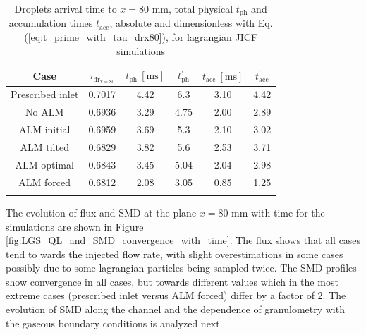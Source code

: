 \begin{table}[!h]
\centering
\caption{Droplets arrival time to $x = 80$ mm, total physical $t_\mathrm{ph}$ and accumulation times $t_\mathrm{acc}$, absolute and dimensionless with Eq. (\ref{eq:t_prime_with_tau_drx80}), for lagrangian JICF simulations}
\begin{tabular}{cccccc}
\thickhline
\textbf{Case} & $\tau_\mathrm{dr_{x=80}}$ & $t_\mathrm{ph}~[\mathrm{ms}]$ &  $t_\mathrm{ph}^{\prime}$ & $t_\mathrm{acc}~[\mathrm{ms}]$  & $t_\mathrm{acc}^{\prime}$  \\
\hline
Prescribed inlet & 0.7017 & 4.42 & 6.3 & 3.10 & 4.42 \\
No ALM & 0.6936 & 3.29 & 4.75 & 2.00 & 2.89 \\
ALM initial & 0.6959 & 3.69 & 5.3 & 2.10 & 3.02 \\
ALM tilted & 0.6829 & 3.82 & 5.6 & 2.53 & 3.71 \\
ALM optimal & 0.6843 & 3.45 & 5.04 & 2.04 & 2.98 \\
ALM forced  & 0.6812 & 2.08 & 3.05 & 0.85 & 1.25 \\
\thickhline
\end{tabular}
\label{tab:jicf_LGS_t_prime_accumulation}
\end{table}

	The evolution of flux and SMD at the plane $x = 80$ mm with time for the simulations are shown in Figure \ref{fig:LGS_QL_and_SMD_convergence_with_time}. The flux shows that all cases tend to wards the injected flow rate, with slight overestimations in some cases possibly due to some lagrangian particles being sampled twice. The SMD profiles show convergence in all cases, but towards different values which in the most extreme cases (prescribed inlet versus ALM forced) differ by a factor of 2. The evolution of SMD along the channel and the dependence of granulometry with the gaseous boundary conditions is analyzed next. 
	
\clearpage
	


